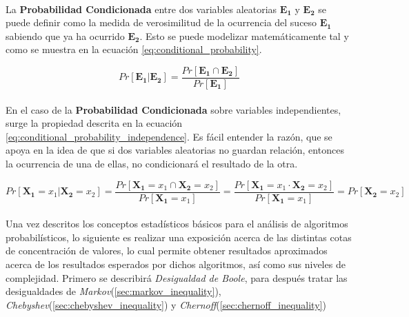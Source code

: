 \documentclass{subfiles}
\begin{document}
        \paragraph{}
        La \textbf{Probabilidad Condicionada} entre dos variables aleatorias $\boldsymbol{E_1}$ y $\boldsymbol{E_2}$ se puede definir como la medida de verosimilitud de la ocurrencia del suceso $\boldsymbol{E_1}$ sabiendo que ya ha ocurrido $\boldsymbol{E_2}$. Esto se puede modelizar matemáticamente tal y como se muestra en la ecuación \eqref{eq:conditional_probability}.

        \begin{equation}
        \label{eq:conditional_probability}
          Pr[\boldsymbol{E_1} \rvert \boldsymbol{E_2}] = \frac{Pr[\boldsymbol{E_1} \cap \boldsymbol{E_2}]}{Pr[\boldsymbol{E_1}]}
        \end{equation}

        \paragraph{}
        En el caso de la \textbf{Probabilidad Condicionada} sobre variables independientes, surge la propiedad descrita en la ecuación \eqref{eq:conditional_probability_independence}. Es fácil entender la razón, que se apoya en la idea de que si dos variables aleatorias no guardan relación, entonces la ocurrencia de una de ellas, no condicionará el resultado de la otra.


        \begin{equation}
        \label{eq:conditional_probability_independence}
          Pr[\boldsymbol{X_1} = x_1 \rvert \boldsymbol{X_2} = x_2] =
          \frac{Pr[\boldsymbol{X_1} = x_1 \cap  \boldsymbol{X_2} = x_2]}{Pr[\boldsymbol{X_1} = x_1]} =
          \frac{Pr[\boldsymbol{X_1} = x_1 \cdot \boldsymbol{X_2} = x_2]}{Pr[\boldsymbol{X_1} = x_1]} =
          Pr[\boldsymbol{X_2} = x_2]
        \end{equation}


        \paragraph{}
        Una vez descritos los conceptos estadísticos básicos para el análisis de algoritmos probabilísticos, lo siguiente es realizar una exposición acerca de las distintas cotas de concentración de valores, lo cual permite obtener resultados aproximados acerca de los resultados esperados por dichos algoritmos, así como sus niveles de complejidad. Primero se describirá \emph{Desigualdad de Boole}, para después tratar las desigualdades de \emph{Markov}(\ref{sec:markov_inequality}), \emph{Chebyshev}(\ref{sec:chebyshev_inequality}) y \emph{Chernoff}(\ref{sec:chernoff_inequality})
\end{document}
